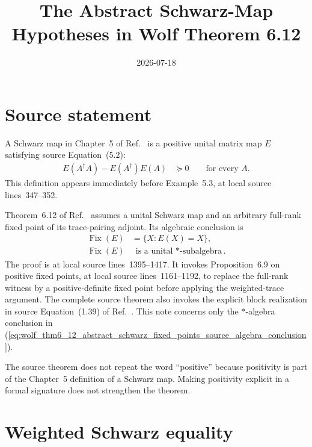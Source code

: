 \documentclass{article}
\title{The Abstract Schwarz-Map Hypotheses in Wolf Theorem 6.12}
\author{}
\date{2026-07-18}
\begin{document}
\maketitle
{}

\section{Source statement}

A Schwarz map in Chapter~5 of Ref.~\cite{Wolf2012Quantum} is a positive unital
matrix map $E$ satisfying source Equation~(5.2):
\begin{align}
  E(A^\dagger A)-E(A^\dagger)E(A)
    &\succeq0
    \qquad\text{for every }A.
  \label{eq:wolf_thm6_12_abstract_schwarz_fixed_points_schwarz_inequality}
\end{align}
This definition appears immediately before Example~5.3, at local source
lines~347--352.

Theorem~6.12 of Ref.~\cite{Wolf2012Quantum} assumes a unital Schwarz map and
an arbitrary full-rank fixed point of its trace-pairing adjoint. Its algebraic
conclusion is
\begin{align}
  \operatorname{Fix}(E)
    &=\{X:E(X)=X\},
  \label{eq:wolf_thm6_12_abstract_schwarz_fixed_points_fixed_space_definition}\\
  \operatorname{Fix}(E)
    &\text{ is a unital $*$-subalgebra}.
  \label{eq:wolf_thm6_12_abstract_schwarz_fixed_points_source_algebra_conclusion}
\end{align}
The proof is at local source lines~1395--1417. It invokes Proposition~6.9 on
positive fixed points, at local source lines~1161--1192, to replace the
full-rank witness by a positive-definite fixed point before applying the
weighted-trace argument. The complete source theorem also invokes the explicit
block realization in source Equation~(1.39) of Ref.~\cite{Wolf2012Quantum}. This note concerns only the
$*$-algebra conclusion in
(\ref{eq:wolf_thm6_12_abstract_schwarz_fixed_points_source_algebra_conclusion}).

The source theorem does not repeat the word ``positive'' because positivity is
part of the Chapter~5 definition of a Schwarz map. Making positivity explicit
in a formal signature does not strengthen the theorem.

\section{Weighted Schwarz equality}
\end{document}
